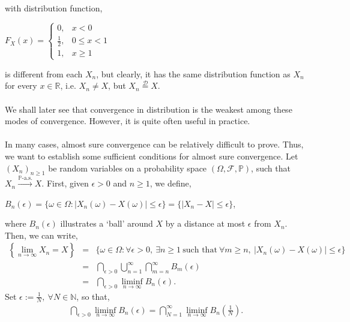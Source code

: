 \documentclass{article}
\begin{document}
with distribution function,
\begin{center}
	$F_{X}(x) = 
	\begin{cases}
	0, & x < 0 \\
	\frac{1}{2}, & 0 \leq x < 1 \\
	1, & x \geq 1
	\end{cases}$
\end{center}
is different from each $X_n$, but clearly, it has the same distribution function as $X_n$ for every $x \in \mathbb{R}$, i.e. $X_n \neq X$, but $X_n \overset{\mathrm{\mathcal{D}}}{=} X$.\\\\
We shall later see that convergence in distribution is the weakest among these modes of convergence. However, it is quite often useful in practice.\\\\
In many cases, almost sure convergence can be relatively difficult to prove. Thus, we want to establish some sufficient conditions for almost sure convergence. Let $(X_n)_{n\geq1}$ be random variables on a probability space $(\Omega,\mathcal{F},\mathbb{P})$, such that $X_n \xrightarrow{\mathbb{P}\text{-a.s.}} X$. First, given $\epsilon > 0$ and $n \geq 1$, we define,
\begin{center}
	$B_n(\epsilon) = \{\omega\in\Omega: |X_n(\omega) - X(\omega)| \leq \epsilon\} = \{|X_n - X| \leq \epsilon\}$,
\end{center}
where $B_n(\epsilon)$ illustrates a ‘ball’ around $X$ by a distance at most $\epsilon$ from $X_n$. Then, we can write,
\begin{eqnarray}
\nonumber
\left\{\lim_{n\to\infty}X_n = X\right\} &=& \{\omega\in\Omega: \forall \epsilon>0, \ \exists n \geq 1 \ \text{such that} \ \forall m \geq n, \ |X_n(\omega) - X(\omega)| \leq \epsilon\}\\
\nonumber
&=& \bigcap_{\epsilon>0}\bigcup_{n=1}^{\infty}\bigcap_{m=n}^{\infty}B_m(\epsilon)\\
\nonumber
&=& \bigcap_{\epsilon>0}\liminf_{n\to\infty}B_n(\epsilon).
\end{eqnarray}
Set $\epsilon := \frac{1}{N}, \ \forall N \in \mathbb{N}$, so that,
\begin{eqnarray}
\nonumber
\bigcap_{\epsilon>0}\liminf_{n\to\infty}B_n(\epsilon) = \bigcap_{N=1}^{\infty}\liminf_{n\to\infty}B_n\left(\frac{1}{N}\right).
\end{eqnarray}
\noindent{}\\\\\\
\end{document}
